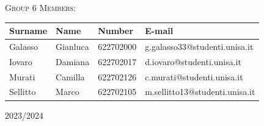 \begin{titlepage}
    \textsc{Group 6 Members:}\\
    \begin{table}[h!]
        \centering
        \begin{tabular}{| m{3cm} | m{3cm} | m{3cm} | m{6cm} |}
        \hline
        \textbf{Surname} & \textbf{Name} & \textbf{Number} & \textbf{E-mail} \\ 
        \hline
        Galasso & Gianluca & 622702000 & g.galasso33@studenti.unisa.it \\ 
        \hline
        Iovaro & Damiana & 622702017 & d.iovaro@studenti.unisa.it \\ 
        \hline
        Murati & Camilla & 622702126 & c.murati@studenti.unisa.it \\ 
        \hline
        Sellitto & Marco & 622702105 & m.sellitto13@studenti.unisa.it \\ 
        \hline
        \end{tabular}
        \label{table:1}
    \end{table}

    \vfill
    \begin{center}
        {\Large 2023/2024}
    \end{center}
    

\end{titlepage}
